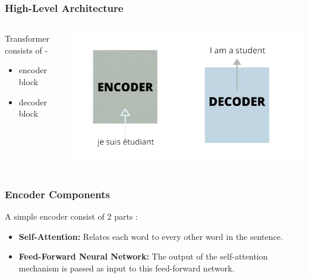 \documentclass{beamer}
\begin{document}
\begin{frame}
    \frametitle{High-Level Architecture}
    
   
    \begin{columns}
        \begin{column}{0.5\textwidth}
        \centering
            Transformer consists of -
            \centering
            \begin{itemize}
            
               \centering \item encoder block
               \centering \item decoder block
            \end{itemize} 
            
        \end{column}
        
        \begin{column}{0.6\textwidth}
            \includegraphics[width=\textwidth]{encoderdecoder-removebg-preview.png}
        \end{column}
    \end{columns}
\end{frame}


\begin{frame}
    \frametitle{Encoder Components}
    A simple encoder consist of 2 parts :
    \begin{itemize}
        \item \textbf{Self-Attention:} Relates each word to every other word in the sentence.
    \end{itemize}

    \pause

    \begin{itemize}
        \item \textbf{Feed-Forward Neural Network:} The output of the self-attention mechanism is passed as input to this feed-forward network.
    \end{itemize}

\end{frame}
\end{document}
